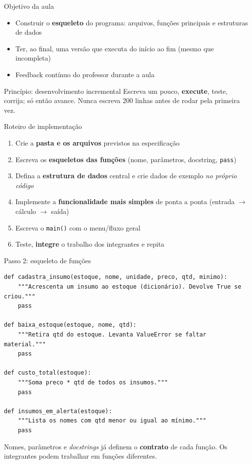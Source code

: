 \documentclass[aspectratio=169,10pt,t]{beamer}
\begin{document}
\capa

\begin{frame}{Objetivo da aula}
  \begin{itemize}
    \item Construir o \textbf{esqueleto} do programa: arquivos, funções principais e estruturas de dados
    \item Ter, ao final, uma versão que \alert{executa} do início ao fim (mesmo que incompleta)
    \item Feedback contínuo do professor durante a aula
  \end{itemize}
  \begin{block}{Princípio: desenvolvimento incremental}
    Escreva um pouco, \textbf{execute}, teste, corrija; só então avance. Nunca escreva 200 linhas antes de rodar pela primeira vez.
  \end{block}
\end{frame}

\begin{frame}{Roteiro de implementação}
  \begin{enumerate}
    \item Crie a \textbf{pasta e os arquivos} previstos na especificação
    \item Escreva os \textbf{esqueletos das funções} (nome, parâmetros, docstring, \texttt{pass})
    \item Defina a \textbf{estrutura de dados} central e crie dados de exemplo \emph{no próprio código}
    \item Implemente a \textbf{funcionalidade mais simples} de ponta a ponta (entrada \(\to\) cálculo \(\to\) saída)
    \item Escreva o \texttt{main()} com o menu/fluxo geral
    \item Teste, \textbf{integre} o trabalho dos integrantes e repita
  \end{enumerate}
\end{frame}

\begin{frame}[fragile]{Passo 2: esqueleto de funções}
\begin{lstlisting}[basicstyle=\ttfamily\scriptsize]
def cadastra_insumo(estoque, nome, unidade, preco, qtd, minimo):
    """Acrescenta um insumo ao estoque (dicionário). Devolve True se criou."""
    pass

def baixa_estoque(estoque, nome, qtd):
    """Retira qtd do estoque. Levanta ValueError se faltar material."""
    pass

def custo_total(estoque):
    """Soma preco * qtd de todos os insumos."""
    pass

def insumos_em_alerta(estoque):
    """Lista os nomes com qtd menor ou igual ao mínimo."""
    pass
\end{lstlisting}
  \small Nomes, parâmetros e \emph{docstrings} já definem o \textbf{contrato} de cada função. Os integrantes podem trabalhar em funções diferentes.
\end{frame}
\end{document}
